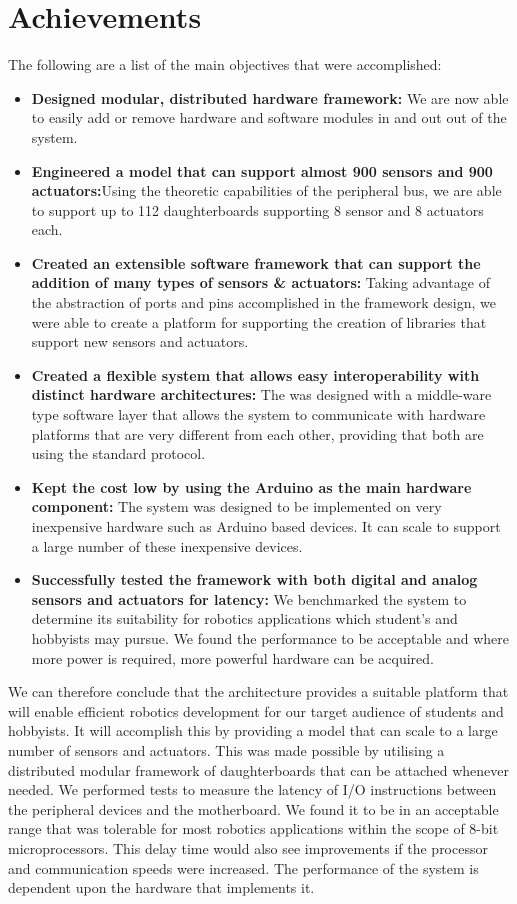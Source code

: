 \section{Achievements}
The following are a list of the main objectives that were accomplished:
\begin{itemize}
\item \textbf{Designed modular, distributed hardware framework:} We are now able to easily add or remove hardware and software modules in and out out of the system.
\item \textbf{Engineered a model that can support almost 900 sensors and 900 actuators:}Using the theoretic capabilities of the \iic peripheral bus, we are able to support up to 112 daughterboards supporting 8 sensor and 8 actuators each.
\item \textbf{Created an extensible software framework that can support the addition of many types of sensors \& actuators:} Taking advantage of the abstraction of ports and pins accomplished in the framework design, we were able to create a platform for supporting the creation of libraries that support new sensors and actuators.
\item \textbf{Created a flexible system that allows easy interoperability with distinct hardware architectures:} The \xten was designed with a middle-ware type software layer that allows the system to communicate with hardware platforms that are very different from each other, providing that both are using the standard protocol.
\item \textbf{Kept the cost low by using the Arduino as the main hardware component:} The system was designed to be implemented on very inexpensive hardware such as Arduino based devices. It can scale to support a large number of these inexpensive devices.
\item \textbf{Successfully tested the framework with both digital and analog sensors and actuators for latency:}
We benchmarked the system to determine its suitability for robotics applications which student's and hobbyists may pursue. We found the performance to be acceptable and where more power is required, more powerful hardware can be acquired.
\end{itemize}



We can therefore conclude that the \xten architecture provides a suitable platform that will enable efficient robotics development for our target audience of students and hobbyists. It will accomplish this by providing a model that can scale to a large number of sensors and actuators. This was made possible by utilising a distributed modular framework of daughterboards that can be attached whenever needed. We performed tests to measure the latency of I/O instructions between the peripheral devices and the motherboard. We found it to be in an acceptable range that was tolerable for most robotics applications within the scope of 8-bit microprocessors. This delay time would also see improvements if the processor and communication speeds were increased. The performance of the system is dependent upon the hardware that implements it.


